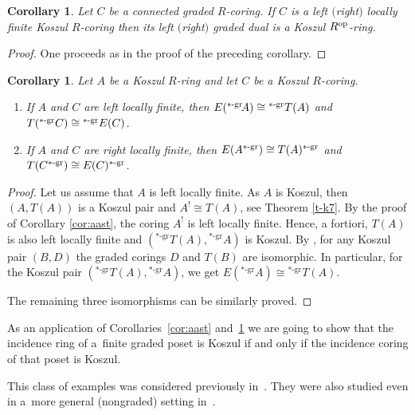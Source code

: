 \documentclass[pdftex]{sigma}
\renewcommand{\^}[1]{\mbox{$^{\left( #1 \right)}$}}
\renewcommand{\_}[1]{\mbox{$_{\left( #1 \right)}$}}
\numberwithin{equation}{section}
\newtheorem{Corollary}[Theorem]{Corollary}
\begin{document}
\begin{Corollary} \label{cor:cast}
Let $C$ be a connected graded $R$-coring. If $C$ is a left $($right$)$ locally finite Koszul $R$-coring then its left $($right$)$ graded dual is a Koszul $R^{\rm op}$-ring.
\end{Corollary}

\begin{proof}
 One proceeds as in the proof of the preceding corollary.
\end{proof}

\begin{Corollary}
Let $A$ be a Koszul $R$-ring and let $C$ be a Koszul $R$-coring.
\begin{enumerate}\itemsep=0pt
 \item[$1.$] If $A$ and $C$ are left locally finite, then $E({}^{*\text{\rm -gr}}\!A)\cong {}^{*\text{\rm -gr}}T(A)$ and $T({}^{*\text{\rm -gr}}C)\cong {}^{*\text{\rm -gr}}E(C)$.

\item[$2.$] If $A$ and $C$ are right locally finite, then $E(A^{*\text{\rm -gr}})\cong T(A)^{*\text{\rm -gr}}$ and $T(C^{*\text{\rm -gr}})\cong E(C)^{*\text{\rm -gr}}$.
\end{enumerate}
\end{Corollary}

\begin{proof}
Let us assume that $A$ is left locally f\/inite. As $A$ is Koszul, then $(A,T(A))$ is a Koszul pair and $A^!\cong T(A)$, see Theorem \ref{t-k7}. By the proof of Corollary \ref{cor:aast}, the coring $A^!$ is left locally f\/inite. Hence, a fortiori, $T(A)$ is also left locally f\/inite and $(^{*\text{-gr}}T(A),{}^{*\text{-gr}}A)$ is Koszul. By \cite[Theorem~2.9]{jps}, for any Koszul pair $(B,D)$ the graded corings $D$ and $T(B)$ are isomorphic. In particular, for the Koszul pair $(^{*\text{-gr}}T(A),{}^{*\text{-gr}}A)$, we get $E({}^{*\text{-gr}}\!A)\cong {}^{*\text{-gr}}T(A)$.

The remaining three isomorphisms can be similarly proved.
\end{proof}

As an application of Corollaries~\ref{cor:aast} and~\ref{cor:cast} we are going to show that the incidence ring of a~f\/inite graded poset is Koszul if and only if the incidence coring of that poset is Koszul.

This class of examples was considered previously in~\cite{polo,wood}. They were also studied even in a~more general (nongraded) setting in~\cite{str}.
\end{document}
